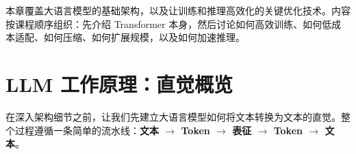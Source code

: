 本章覆盖大语言模型的基础架构，以及让训练和推理高效化的关键优化技术。内容按课程顺序组织：先介绍 Transformer 本身，然后讨论如何高效训练、如何低成本适配、如何压缩、如何扩展规模，以及如何加速推理。

\section{LLM 工作原理：直觉概览}
\label{how-llms-work-an-intuitive-overview}

在深入架构细节之前，让我们先建立大语言模型如何将文本转换为文本的直觉。整个过程遵循一条简单的流水线：\textbf{文本 $\to$ Token $\to$ 表征 $\to$ Token $\to$ 文本}。

